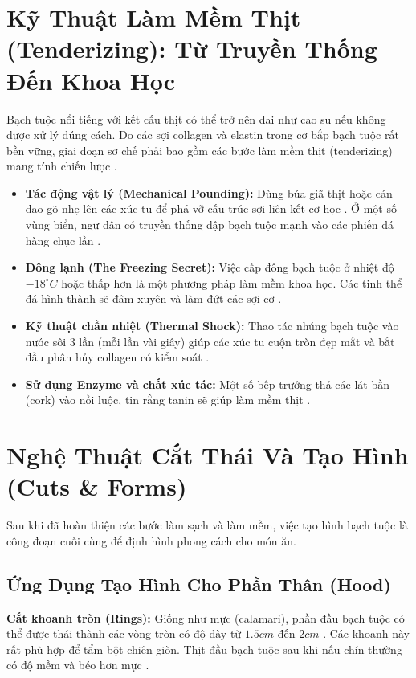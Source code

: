 \documentclass[12pt,a4paper]{report}
\begin{document}
\section{Kỹ Thuật Làm Mềm Thịt (Tenderizing): Từ Truyền Thống Đến Khoa Học}

Bạch tuộc nổi tiếng với kết cấu thịt có thể trở nên dai như cao su nếu không được xử lý đúng cách. Do các sợi collagen và elastin trong cơ bắp bạch tuộc rất bền vững, giai đoạn sơ chế phải bao gồm các bước làm mềm thịt (tenderizing) mang tính chiến lược \cite{ref18}.

\begin{itemize}
    \item \textbf{Tác động vật lý (Mechanical Pounding):} Dùng búa giã thịt hoặc cán dao gõ nhẹ lên các xúc tu để phá vỡ cấu trúc sợi liên kết cơ học \cite{ref17}. Ở một số vùng biển, ngư dân có truyền thống đập bạch tuộc mạnh vào các phiến đá hàng chục lần \cite{ref13}.
    \item \textbf{Đông lạnh (The Freezing Secret):} Việc cấp đông bạch tuộc ở nhiệt độ $-18^\circ C$ hoặc thấp hơn là một phương pháp làm mềm khoa học. Các tinh thể đá hình thành sẽ đâm xuyên và làm đứt các sợi cơ \cite{ref4}.
    \item \textbf{Kỹ thuật chần nhiệt (Thermal Shock):} Thao tác nhúng bạch tuộc vào nước sôi 3 lần (mỗi lần vài giây) giúp các xúc tu cuộn tròn đẹp mắt và bắt đầu phân hủy collagen có kiểm soát \cite{ref13}.
    \item \textbf{Sử dụng Enzyme và chất xúc tác:} Một số bếp trưởng thả các lát bần (cork) vào nồi luộc, tin rằng tanin sẽ giúp làm mềm thịt \cite{ref25}.
\end{itemize}

\section{Nghệ Thuật Cắt Thái Và Tạo Hình (Cuts \& Forms)}

Sau khi đã hoàn thiện các bước làm sạch và làm mềm, việc tạo hình bạch tuộc là công đoạn cuối cùng để định hình phong cách cho món ăn.

\subsection{Ứng Dụng Tạo Hình Cho Phần Thân (Hood)}

\textbf{Cắt khoanh tròn (Rings):} Giống như mực (calamari), phần đầu bạch tuộc có thể được thái thành các vòng tròn có độ dày từ $1.5cm$ đến $2cm$ \cite{ref18}. Các khoanh này rất phù hợp để tẩm bột chiên giòn. Thịt đầu bạch tuộc sau khi nấu chín thường có độ mềm và béo hơn mực \cite{ref31}.
\end{document}
